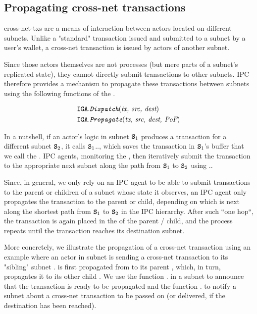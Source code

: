 \subsection{Propagating cross-net transactions}
\label{sec:cross-net-tx}

\Glspl{cross-net-tx} are a means of interaction between actors located on different subnets.
Unlike a "standard" transaction issued and submitted to a subnet by a user's wallet,
a cross-net transaction is issued by actors of another subnet.

Since those actors themselves are not processes (but mere parts of a subnet's replicated state),
they cannot directly submit transactions to other subnets.
IPC therefore provides a mechanism to propagate these transactions between subnets using the following functions of the \gw.

\begin{align*}
    \texttt{IGA}.&\textit{\texttt{Dispatch}}(\textit{tx, src, dest})\\
    \texttt{IGA}.&\textit{\texttt{Propagate}}(\textit{tx, src, dest, \textit{PoF}})
\end{align*}

In a nutshell, if an actor's logic in subnet $\textbf{\texttt{S}}_1$ produces a transaction for a different subnet $\textbf{\texttt{S}}_2$,
it calls $\textbf{\texttt{S}}_1$.\gw., which saves the transaction in $\textbf{\texttt{S}}_1$'s \gw buffer that we call the \emph{\postoffice}.
IPC agents, monitoring the \postoffice, then iteratively submit the transaction to the appropriate next subnet along the path from $\textbf{\texttt{S}}_1$ to $\textbf{\texttt{S}}_2$ using \gw..

Since, in general, we only rely on an IPC agent to be able to submit transactions to the parent or children of a subnet whose state it observes,
an IPC agent only propagates the transaction to the parent or child, depending on which is next along the shortest path from $\textbf{\texttt{S}}_1$ to $\textbf{\texttt{S}}_2$ in the IPC hierarchy.
After such ``one hop``, the transaction is again placed in the \postoffice of the parent / child, and the process repeats until the transaction reaches its destination subnet.

More concretely, we illustrate the propagation of a cross-net transaction using an example where an actor in subnet 
is sending a cross-net transaction  to its "sibling" subnet .
 is first propagated from  to its parent , which, in turn, propagates it to its other child .
We use the function \gw. in a subnet to announce that the transaction is ready to be propagated
and the function \gw. to notify a subnet about a cross-net transaction to be passed on (or delivered, if the destination has been reached).

